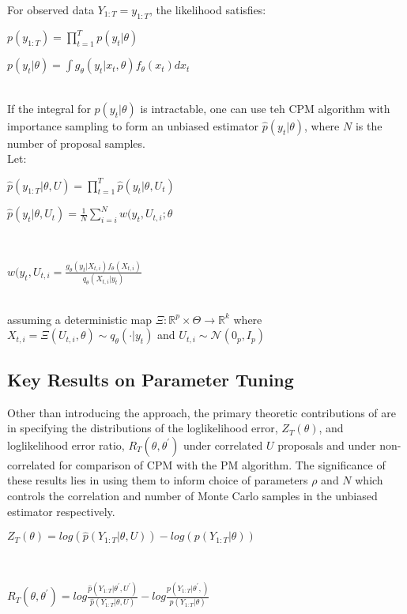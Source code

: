 \documentclass{article}
\begin{document}
For observed data $Y_{1:T}=y_{1:T}$, the likelihood satisfies: \\
\centerline{$p(y_{1:T})= \prod_{t=1}^{T} p(y_t|\theta)$}\newline
\centerline{$p(y_t| \theta)= \int g_\theta(y_t|x_t,\theta)f_\theta(x_t) dx_t$}\\

If the integral for $p(y_t| \theta)$ is intractable, one can use teh CPM algorithm with importance sampling  to form an unbiased estimator $\hat{p}(y_t| \theta)$, where $N$ is the number of proposal samples. \\

Let: \\
\centerline{$\hat{p}(y_{1:T}| \theta, U) = \prod_{t=1}^{T} \hat{p}(y_t|\theta, U_t)$}
\centerline{$\hat{p}(y_t| \theta, U_t)= \frac{1}{N} \sum_{i=i}^N w(y_t, U_{t,i}; \theta$}\\
\centerline{$w(y_t, U_{t,i} = \frac{g_\theta(y_t|X_{t,i})f_\theta(X_{t,i})}{q_\theta(X_{t,i}|y_t)}$} \\

assuming a deterministic map $ \Xi: \mathbb{R}^p \times \Theta \rightarrow \mathbb{R}^k$ where \\
$X_{t,i} = \Xi(U_{t,i}, \theta) \sim q_\theta(\cdot|y_t)$ and $U_{t,i} \sim \mathcal{N}(0_p, I_p) $

\subsection{Key Results on Parameter Tuning}

Other than introducing the approach, the primary theoretic contributions of \cite{cpmmDeligiannidis2015} are in specifying the distributions of the loglikelihood error, $Z_T(\theta)$, and loglikelihood error ratio, $R_T(\theta, \theta^\prime)$ under correlated $U$ proposals and under non-correlated for comparison of CPM with the PM algorithm. The significance of these results lies in using them to inform choice of parameters $\rho$ and $N$ which controls the correlation and number of Monte Carlo samples in the unbiased estimator respectively. \\

\centerline{$Z_T(\theta) = log(\hat{p}(Y_{1:T}| \theta, U)) - log(p(Y_{1:T}|\theta))$} \\


\centerline{$R_T(\theta, \theta^\prime) = log \frac{\hat{p}(Y_{1:T}| \theta^\prime, U^\prime)}{\hat{p}(Y_{1:T}| \theta, U)} - log \frac{p(Y_{1:T}| \theta^\prime,)}{p(Y_{1:T}| \theta)}$} \\
\end{document}
